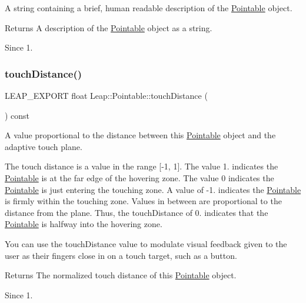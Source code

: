 A string containing a brief, human readable description of the \hyperlink{class_leap_1_1_pointable}{Pointable} object.

\begin{DoxyReturn}{Returns}
A description of the \hyperlink{class_leap_1_1_pointable}{Pointable} object as a string. 
\end{DoxyReturn}
\begin{DoxySince}{Since}
1. 
\end{DoxySince}
\mbox{\label{class_leap_1_1_pointable_acf8554de21f3c475a39d12f8b2931e89}} 
\subsubsection{\texorpdfstring{touch\+Distance()}{touchDistance()}}
{\footnotesize\ttfamily L\+E\+A\+P\+\_\+\+E\+X\+P\+O\+RT float Leap\+::\+Pointable\+::touch\+Distance (\begin{DoxyParamCaption}{ }\end{DoxyParamCaption}) const}

A value proportional to the distance between this \hyperlink{class_leap_1_1_pointable}{Pointable} object and the adaptive touch plane.



The touch distance is a value in the range \mbox{[}-\/1, 1\mbox{]}. The value 1. indicates the \hyperlink{class_leap_1_1_pointable}{Pointable} is at the far edge of the hovering zone. The value 0 indicates the \hyperlink{class_leap_1_1_pointable}{Pointable} is just entering the touching zone. A value of -\/1. indicates the \hyperlink{class_leap_1_1_pointable}{Pointable} is firmly within the touching zone. Values in between are proportional to the distance from the plane. Thus, the touch\+Distance of 0. indicates that the \hyperlink{class_leap_1_1_pointable}{Pointable} is halfway into the hovering zone.


\begin{DoxyCodeInclude}
\end{DoxyCodeInclude}


You can use the touch\+Distance value to modulate visual feedback given to the user as their fingers close in on a touch target, such as a button.

\begin{DoxyReturn}{Returns}
The normalized touch distance of this \hyperlink{class_leap_1_1_pointable}{Pointable} object. 
\end{DoxyReturn}
\begin{DoxySince}{Since}
1. 
\end{DoxySince}
\mbox{\label{class_leap_1_1_pointable_acc5165280316d69ed18dd9ea99c410a7}} 
